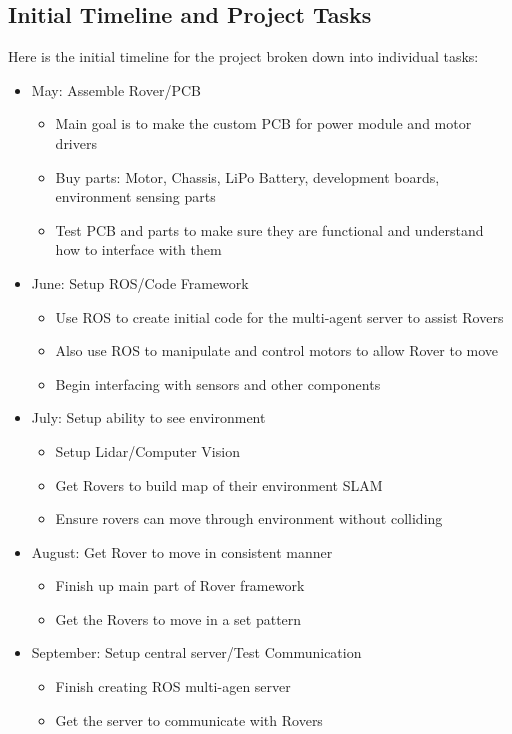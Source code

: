 \documentclass[conference]{IEEEtran}
\begin{document}
\subsection{Initial Timeline and Project Tasks}\label{AA}
Here is the initial timeline for the project broken down into individual tasks:
\begin{itemize}
	\item May: Assemble Rover/PCB
	\begin{itemize}
		\item Main goal is to make the custom PCB for power module and motor drivers
		\item Buy parts: Motor, Chassis, LiPo Battery, development boards, environment sensing parts
		\item Test PCB and parts to make sure they are functional and understand how to interface with them
	\end{itemize}
	\item June: Setup ROS/Code Framework
	\begin{itemize}
		\item Use ROS to create initial code for the multi-agent server to assist Rovers
		\item Also use ROS to manipulate and control motors to allow Rover to move
		\item Begin interfacing with sensors and other components
	\end{itemize}
	\item July: Setup ability to see environment
	\begin{itemize}
		\item Setup Lidar/Computer Vision
		\item Get Rovers to build map of their environment SLAM
		\item Ensure rovers can move through environment without colliding
	\end{itemize}
	\item August: Get Rover to move in consistent manner
	\begin{itemize}
		\item Finish up main part of Rover framework
		\item Get the Rovers to move in a set pattern
	\end{itemize}
	\item September: Setup central server/Test Communication
	\begin{itemize}
		\item Finish creating ROS multi-agen server
		\item Get the server to communicate with Rovers

\end{itemize}
\end{itemize}
\end{document}
